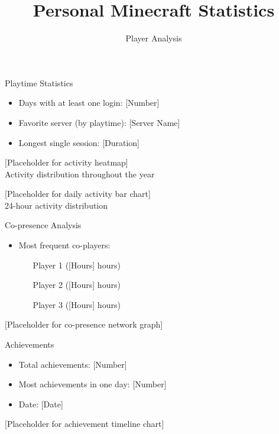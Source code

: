 \documentclass{ctexbeamer}
\title{Personal Minecraft Statistics}
\author{Player Analysis}
\date{}
\begin{document}
\frame{\titlepage}

\begin{frame}{Playtime Statistics}
    \begin{itemize}
        \item Days with at least one login: [Number]
        \item Favorite server (by playtime): [Server Name]
        \item Longest single session: [Duration]
    \end{itemize}
    \begin{center}
        [Placeholder for activity heatmap]\\
        \small{Activity distribution throughout the year}
    \end{center}
    \begin{center}
        [Placeholder for daily activity bar chart]\\
        \small{24-hour activity distribution}
    \end{center}
\end{frame}

\begin{frame}{Co-presence Analysis}
    \begin{itemize}
        \item Most frequent co-players:
        \begin{enumerate}
            \item [Player 1] ([Hours] hours)
            \item [Player 2] ([Hours] hours)
            \item [Player 3] ([Hours] hours)
        \end{enumerate}
    \end{itemize}
    [Placeholder for co-presence network graph]
\end{frame}

\begin{frame}{Achievements}
    \begin{itemize}
        \item Total achievements: [Number]
        \item Most achievements in one day: [Number]
        \item Date: [Date]
    \end{itemize}
    [Placeholder for achievement timeline chart]
\end{frame}
\end{document}
